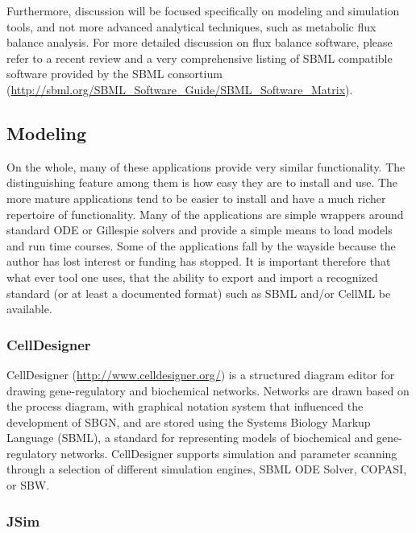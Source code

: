 \documentclass[]{article}
\begin{document}
Furthermore, discussion will be focused specifically on modeling and
simulation tools, and not more advanced analytical techniques, such as
metabolic flux balance analysis. For more detailed discussion on flux
balance software, please refer to a recent review
\autocite{copeland2012computational} and a very comprehensive listing of
SBML compatible software provided by the SBML consortium
(\url{http://sbml.org/SBML_Software_Guide/SBML_Software_Matrix}).

\subsection{Modeling}

On the whole, many of these applications provide very similar
functionality. The distinguishing feature among them is how easy they
are to install and use. The more mature applications tend to be easier
to install and have a much richer repertoire of functionality. Many of
the applications are simple wrappers around standard ODE or Gillespie
solvers and provide a simple means to load models and run time courses.
Some of the applications fall by the wayside because the author has lost
interest or funding has stopped. It is important therefore that what
ever tool one uses, that the ability to export and import a recognized
standard (or at least a documented format) such as SBML and/or CellML be
available.

\subsubsection{CellDesigner}

CellDesigner (\url{http://www.celldesigner.org/})
\autocite{funahashi2003celldesigner}
\autocite{funahashi2008celldesigner} is a structured diagram editor for
drawing gene-regulatory and biochemical networks. Networks are drawn
based on the process diagram, with graphical notation system that
influenced the development of SBGN, and are stored using the Systems
Biology Markup Language (SBML), a standard for representing models of
biochemical and gene-regulatory networks. CellDesigner supports
simulation and parameter scanning through a selection of different
simulation engines, SBML ODE Solver, COPASI, or SBW.

\subsubsection{JSim \label{jsim}}
\end{document}
